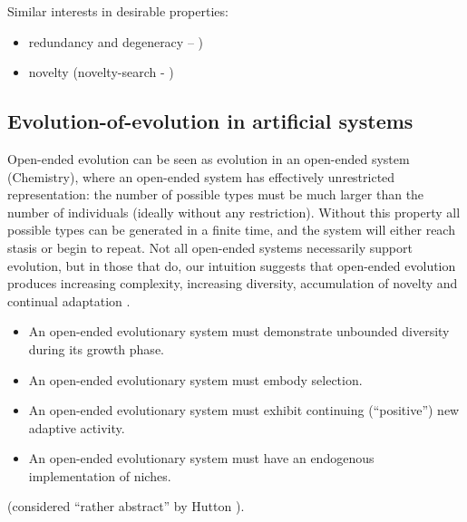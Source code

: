 Similar interests in desirable properties:

\begin{itemize}
	\item redundancy and degeneracy -- \autocite{Whitacre:2010qy})
	\item novelty (novelty-search - \autocite{Lehman:2008cr})
\end{itemize}


\subsection{Evolution-of-evolution in artificial systems}

Open-ended evolution can be seen as evolution in an open-ended system (\eg Chemistry), where an open-ended system has effectively unrestricted representation: the number of possible types must be much larger than the number of individuals (ideally without any restriction). Without this property all possible types can be generated in a finite time, and the system will either reach stasis or begin to repeat. Not all open-ended systems necessarily support evolution, but in those that do, our intuition suggests that open-ended evolution produces increasing complexity, increasing diversity, accumulation of novelty and continual adaptation \cite{Lehman2012}.


\begin{itemize}
	\item An open-ended evolutionary system must demonstrate unbounded diversity during its growth phase.
	\item An open-ended evolutionary system must embody selection.
	\item An open-ended evolutionary system must exhibit continuing (``positive'') new adaptive activity.
	\item An open-ended evolutionary system must have an endogenous implementation of niches.
\end{itemize} \cite{Maley1999} (considered ``rather abstract'' by Hutton \parencite[p.341]{Hutton2002}).


